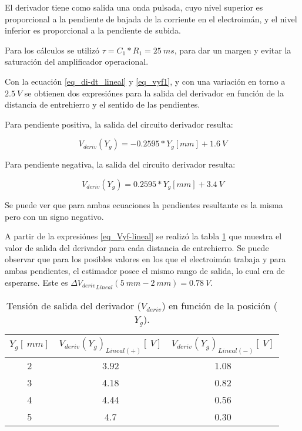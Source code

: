 El derivador tiene como salida una onda pulsada, cuyo nivel superior es proporcional a la pendiente de bajada de la corriente en el electroimán, y el nivel inferior es proporcional a la pendiente de subida.

Para los cálculos se utilizó $\tau = C_1*R_1= 25\:ms$, para dar un margen y evitar la saturación del amplificador operacional.  

Con la ecuación \ref{eq_di-dt_lineal} y \ref{eq_vyf1}, y con una variación en torno a $2.5\:V$ se obtienen dos expresiónes para la salida del derivador en función de la distancia de entrehierro y el sentido de las pendientes.



Para pendiente positiva, la salida del circuito derivador resulta:

\begin{equation} \label{eq_Vyf-lineal}
	V_{deriv}(Y_g) = -0.2595*Y_g[mm] + 1.6\:V
\end{equation}


Para pendiente negativa, la salida del circuito derivador resulta:

\begin{equation} %
	V_{deriv}(Y_g) = 0.2595*Y_g[mm] + 3.4\:V
\end{equation}

Se puede ver que para ambas ecuaciones la pendientes resultante es la misma pero con un signo negativo.

A partir de la expresiónes \ref{eq_Vyf-lineal} se realizó la tabla \ref{tab_Vyf_vs_y} que muestra el valor de salida del derivador para cada distancia de entrehierro. Se puede observar que para los posibles valores en los que el electroimán trabaja y para ambas pendientes, el estimador posee el mismo rango de salida, lo cual era de esperarse. Este es ${\mathit{\Delta}{V_{deriv}}_{Lineal}}(5\:mm-2\:mm)= 0.78\:V$.


\begin{table}[H]
	\begin{center}
		\begin{tabular}{| c | c | c |}
			\hline
			$Y_g[\:mm]$ & ${V_{deriv}(Y_g)}_{Lineal (+)} [\:V]$ & ${V_{deriv}(Y_g)}_{Lineal (-)} [\:V]$
			\\ \hline
			2 & 3.92 & 1.08\\ \hline 
			3 & 4.18 & 0.82\\ \hline 
			4 & 4.44 & 0.56\\ \hline 
			5 & 4.7  & 0.30\\ \hline 
		\end{tabular}
		\caption{Tensión de salida del derivador ($V_{deriv}$) en función de la posición ($Y_g$).}
		\label{tab_Vyf_vs_y}
	\end{center}
\end{table}

